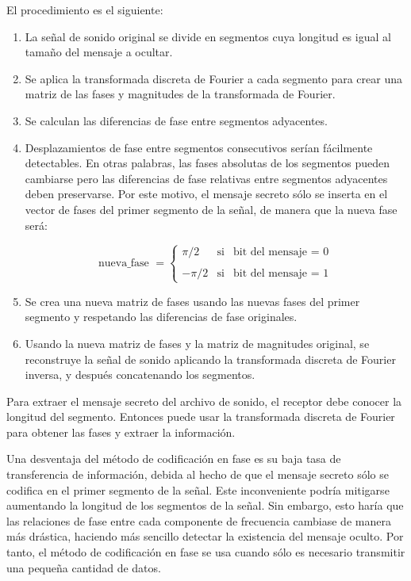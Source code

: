 \documentclass[12pt]{article}
\begin{document}
El procedimiento es el siguiente:

\begin{enumerate}

\item La señal de sonido original se divide en segmentos cuya longitud es igual al tamaño del mensaje a ocultar.

\item Se aplica la transformada discreta de Fourier a cada segmento para crear una matriz de las fases y magnitudes de la transformada de Fourier.

\item Se calculan las diferencias de fase entre segmentos adyacentes.

\item Desplazamientos de fase entre segmentos consecutivos serían fácilmente detectables. En otras palabras, las fases absolutas de los segmentos pueden cambiarse pero las diferencias de fase relativas entre segmentos adyacentes deben preservarse. Por este motivo, el mensaje secreto sólo se inserta en el vector de fases del primer segmento de la señal, de manera que la nueva fase será:

\[
\text{nueva\_fase }=\left\{
\begin{array}{ccc}
\pi /2 & \text{si} & \text{bit del mensaje = 0} \\
&  &  \\
-\pi /2 & \text{si} & \text{bit del mensaje = 1}
\end{array}
\right.
\]

\item Se crea una nueva matriz de fases usando las nuevas fases del primer segmento y respetando las diferencias de fase originales.

\item Usando la nueva matriz de fases y la matriz de magnitudes original, se reconstruye la señal de sonido aplicando la transformada discreta de Fourier inversa, y después concatenando los segmentos.

\end{enumerate}

Para extraer el mensaje secreto del archivo de sonido, el receptor debe conocer la longitud del segmento. Entonces puede usar la transformada discreta de Fourier para obtener las fases y extraer la información.

\medskip

Una desventaja del método de codificación en fase es su baja tasa de transferencia de información, debida al hecho de que el mensaje secreto sólo se codifica en el primer segmento de la señal. Este inconveniente podría mitigarse aumentando la longitud de los segmentos de la señal. Sin embargo, esto haría que las relaciones de fase entre cada componente de frecuencia cambiase de manera más drástica, haciendo más sencillo detectar la existencia del mensaje oculto. Por tanto, el método de codificación en fase se usa cuando sólo es necesario transmitir una pequeña cantidad de datos.
\end{document}
